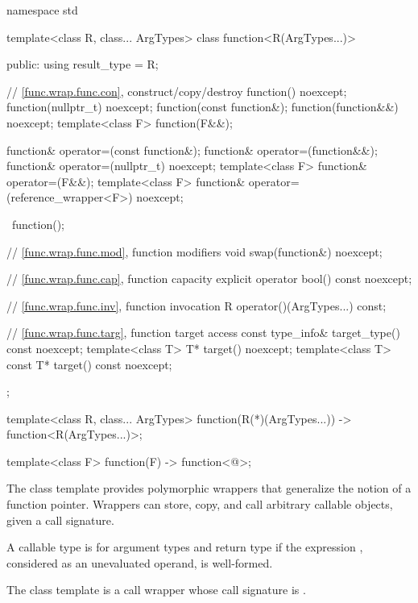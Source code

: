 %
\begin{codeblock}
namespace std {
  template<class R, class... ArgTypes>
  class function<R(ArgTypes...)> {
  public:
    using result_type = R;

    // \ref{func.wrap.func.con}, construct/copy/destroy
    function() noexcept;
    function(nullptr_t) noexcept;
    function(const function&);
    function(function&&) noexcept;
    template<class F> function(F&&);

    function& operator=(const function&);
    function& operator=(function&&);
    function& operator=(nullptr_t) noexcept;
    template<class F> function& operator=(F&&);
    template<class F> function& operator=(reference_wrapper<F>) noexcept;

    ~function();

    // \ref{func.wrap.func.mod}, function modifiers
    void swap(function&) noexcept;

    // \ref{func.wrap.func.cap}, function capacity
    explicit operator bool() const noexcept;

    // \ref{func.wrap.func.inv}, function invocation
    R operator()(ArgTypes...) const;

    // \ref{func.wrap.func.targ}, function target access
    const type_info& target_type() const noexcept;
    template<class T>       T* target() noexcept;
    template<class T> const T* target() const noexcept;
  };

  template<class R, class... ArgTypes>
    function(R(*)(ArgTypes...)) -> function<R(ArgTypes...)>;

  template<class F> function(F) -> function<@\seebelow@>;
}
\end{codeblock}

\pnum
The  class template provides polymorphic wrappers that
generalize the notion of a function pointer. Wrappers can store, copy,
and call arbitrary callable objects, given a call
signature.

\pnum
{}%
A callable type 
is  for argument
types 
and return type 
if the expression
,
considered as an unevaluated operand, is
well-formed.

\pnum
The  class template is a call
wrapper whose call signature
is .

